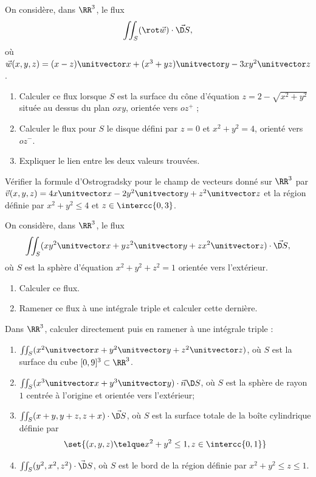 \documentclass[12pt,french,oneside,a4paper]{memoir} %
\begin{document}
\begin{exo}
On considère, dans $\RR^{3}$, le flux
\begin{equation*}
  \iint_{S} (\rot \vec w) \cdot \vec{\D S},
\end{equation*}
où $\vec w(x,y,z) = (x-z)\unitvector x + (x^{3} + yz) \unitvector y - 3xy^{2} \unitvector z$.
\begin{enumerate}
\item Calculer ce flux lorsque $S$ est la surface du cône d'équation $z = 2 - \sqrt{x^{2} + y^{2}}$ située au dessus du plan $oxy$, orientée vers $oz^{+}$ ;
\item Calculer le flux pour $S$ le disque défini par $z = 0$ et $x^{2} + y^{2} = 4$, orienté vers $oz^{-}$.
\item Expliquer le lien entre les deux valeurs trouvées.
\end{enumerate}
\end{exo}

\begin{exo}
Vérifier la formule d'Ostrogradsky pour le champ de vecteurs donné sur $\RR^{3}$ par $\vec v (x,y,z) = 4x \unitvector x - 2y^{2} \unitvector y + z^{2} \unitvector z$ et la région définie par $x^{2} + y^{2} \leq 4$ et $z \in \intercc{0,3}$.
\end{exo}
\begin{exo}
On considère, dans $\RR^{3}$, le flux
\begin{equation*}
  \iint_{S} (xy^{2} \unitvector x + yz^{2} \unitvector y + zx^{2} \unitvector z) \cdot \vec{\D S},
\end{equation*}
où $S$ est la sphère d'équation $x^{2} + y^{2} + z^{2} = 1$ orientée vers l'extérieur.
\begin{enumerate}
\item Calculer ce flux.
\item Ramener ce flux à une intégrale triple et calculer cette dernière.
\end{enumerate}
\end{exo}
\begin{exo}
Dans $\RR^{3}$, calculer directement puis en ramener à une intégrale triple :
\begin{enumerate}
\item $\iint_{S}  (x^{2} \unitvector x + y^{2} \unitvector y + z^{2} \unitvector z)$, où $S$ est la surface du cube $[0,9]^{3}\subset\RR^{3}$.
\item $\iint_{S} (x^{3} \unitvector x + y^{3} \unitvector y)\cdot \vec n \D S$, où $S$ est la sphère de rayon $1$ centrée à l'origine et orientée vers l'extérieur;
\item $\iint_{S} (x+y,y+z,z+x)\cdot \vec{\D S}$, où $S$ est la surface totale de la boîte cylindrique définie par
  \begin{equation*}
    \set{(x,y,z) \telque x^{2} + y^{2} \leq 1, z \in \intercc{0,1}}
  \end{equation*}
\item $\iint_{S} (y^{2},x^{2}, z^{2}) \cdot \vec  \D S$, où $S$ est le bord de la région définie par $x^{2} + y^{2} \leq z \leq 1$.
\end{enumerate}
\end{exo}
\end{document}

